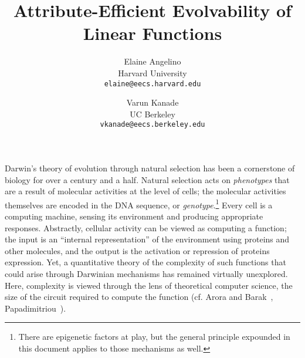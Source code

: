 \documentclass{acmtr2e}
\begin{document}
\title{Attribute-Efficient Evolvability of Linear Functions} 
\author{Elaine Angelino \\
Harvard University \\ \texttt{elaine@eecs.harvard.edu} \and Varun
Kanade \\ UC Berkeley \\ \texttt{vkanade@eecs.berkeley.edu}}

\maketitle

Darwin's theory of evolution through natural selection has been a cornerstone of
biology for over a century and a half.  Natural selection acts on
\emph{phenotypes} that are a result of molecular activities at the level of
cells; the molecular activities themselves are encoded in the DNA sequence, or
\emph{genotype}.\footnote{There are epigenetic factors at play, but the general
principle expounded in this document applies to those mechanisms as well.}
Every cell is a computing machine, sensing its environment and producing
appropriate responses.  Abstractly, cellular activity can be viewed as computing
a function; the input is an ``internal representation'' of the environment using
proteins and other molecules, and the output is the activation or repression
of proteins expression. Yet, a quantitative theory of the complexity of such
functions that could arise through Darwinian mechanisms has remained virtually
unexplored. Here, complexity is viewed through the lens of theoretical
computer science, \eg the size of the circuit required to compute the
function (cf. Arora and Barak~\cite{Arora-Barak:textbook},
Papadimitriou~\cite{Papadimitriou:textbook}).
\end{document}

